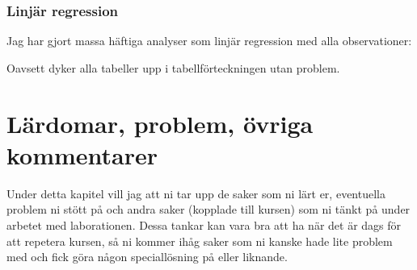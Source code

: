 \documentclass[11pt, openany]{article}
\begin{document}
\subsection*{Linjär regression}
Jag har gjort massa häftiga analyser som linjär regression med alla  observationer:



Oavsett dyker alla tabeller upp i tabellförteckningen utan problem.

\pagebreak

\chapter{Lärdomar, problem, övriga kommentarer}
Under detta kapitel vill jag att ni tar upp de saker som ni lärt er, eventuella problem ni stött på och andra saker (kopplade till kursen) som ni tänkt på under arbetet med laborationen. Dessa tankar kan vara bra att ha när det är dags för att repetera kursen, så ni kommer ihåg saker som ni kanske hade lite problem med och fick göra någon speciallösning på eller liknande.


\end{document}
